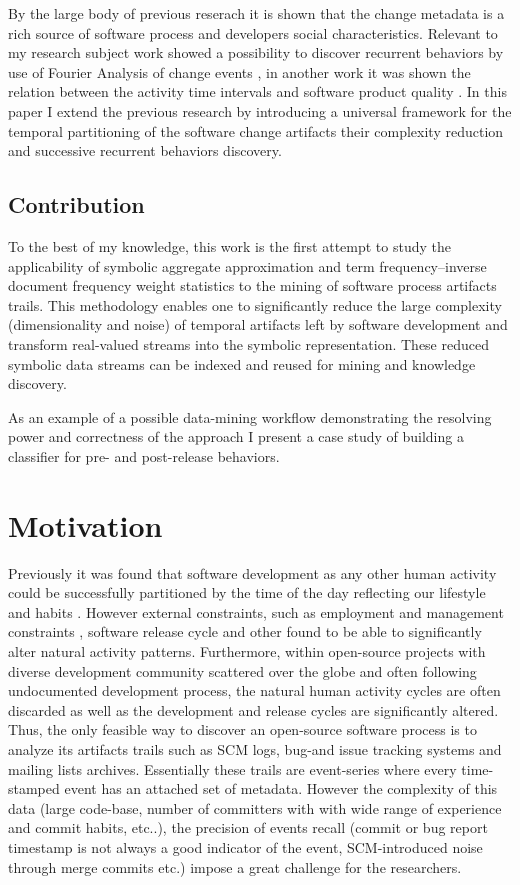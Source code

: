 \documentclass[10pt, conference, compsocconf]{IEEEtran}
\begin{document}
By the large body of previous reserach it is shown that the change metadata is a rich 
source of software process and developers social characteristics. Relevant to my
research subject work showed a possibility to discover recurrent behaviors by use 
of Fourier Analysis of change events \cite{citeulike:10377345}, in another work it was shown
the relation between the activity time intervals and software product quality 
\cite{citeulike:10392277}. In this paper I extend the previous research by introducing 
a universal framework for the temporal partitioning of the software change artifacts 
their complexity reduction and successive recurrent behaviors discovery.

\subsection{Contribution}
To the best of my knowledge, this work is the first attempt to study the applicability
of symbolic aggregate approximation and term frequency–inverse document frequency
weight statistics to the mining of software process artifacts trails. 
This methodology enables one to significantly reduce the large complexity 
(dimensionality and noise) of temporal artifacts left by software development and
transform real-valued streams into the symbolic representation. These reduced symbolic 
data streams can be indexed and reused for mining and knowledge discovery. 

As an example of a possible data-mining workflow demonstrating the resolving power 
and correctness of the approach I present a case study of building a classifier
for pre- and post-release behaviors. 

\section{Motivation}
Previously it was found that software development as any other human activity could be 
successfully partitioned by the time of the day reflecting our lifestyle and habits
\cite{citeulike:10396459} \cite{citeulike:10392305}. However external constraints, 
such as employment and management constraints \cite{citeulike:6095797}, 
software release cycle \cite{citeulike:2739216} and other found to be able 
to significantly alter natural activity patterns. Furthermore, within open-source 
projects with diverse development community scattered over the globe and 
often following undocumented development process, the natural human activity cycles 
are often discarded as well as the development and release cycles are significantly altered.
Thus, the only feasible way to discover an open-source software process is to analyze 
its artifacts trails such as SCM logs, bug-and issue tracking systems and 
mailing lists archives. Essentially these trails are event-series where every 
time-stamped event has an attached set of metadata. 
However the complexity of this data (large code-base, number of committers 
with with wide range of experience and commit habits, etc..), the precision of 
events recall (commit or bug report timestamp is not always a good indicator of the 
event, SCM-introduced noise through merge commits etc.) impose a great 
challenge for the researchers.
\end{document}
